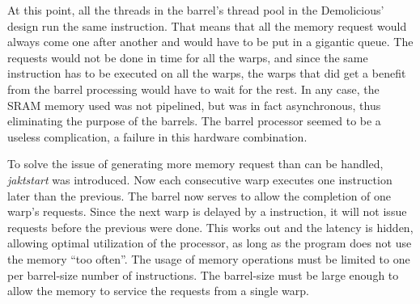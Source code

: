 \documentclass[../main/report.tex]{subfiles}
\begin{document}
At this point, all the threads in the barrel's thread pool in the Demolicious' design run the same instruction.
That means that all the memory request would always come one after another and would have to be put in a gigantic queue.
The requests would not be done in time for all the warps, and since the same instruction has to be executed on all the warps, the warps that did get a benefit from the barrel processing would have to wait for the rest.
In any case, the SRAM memory used was not pipelined, but was in fact asynchronous, thus eliminating the purpose of the barrels.
The barrel processor seemed to be a useless complication, a failure in this hardware combination.

To solve the issue of generating more memory request than can be handled, \emph{jaktstart} was introduced.
Now each consecutive warp executes one instruction later than the previous.
The barrel now serves to allow the completion of one warp's requests.
Since the next warp is delayed by a instruction, it will not issue requests before the previous were done.
This works out and the latency is hidden, allowing optimal utilization of the processor, as long as the program does not use the memory ``too often''.
The usage of memory operations must be limited to one per barrel-size number of instructions.
The barrel-size must be large enough to allow the memory to service the requests from a single warp.
\end{document}
